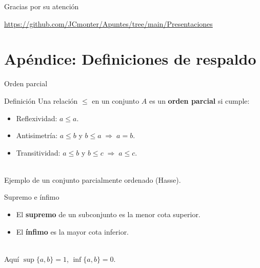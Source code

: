\documentclass[compress,12pt]{beamer}
\begin{document}
\begin{frame}
      \centering
      \Huge{\smiley Gracias por su atención\smiley}
      \vfill
      \scalebox{4}{\faGithub} \par\bigskip
      \url{https://github.com/JCmonter/Apuntes/tree/main/Presentaciones} \\
\end{frame}

\appendix
\section*{Apéndice: Definiciones de respaldo}

\begin{frame}{Orden parcial}
  \begin{block}{Definición}
    Una relación $\leq$ en un conjunto $A$ es un \textbf{orden parcial} si cumple:
    \begin{itemize}
      \item Reflexividad: $a \leq a$.
      \item Antisimetría: $a \leq b$ y $b \leq a \;\Rightarrow\; a=b$.
      \item Transitividad: $a \leq b$ y $b \leq c \;\Rightarrow\; a \leq c$.
    \end{itemize}
  \end{block}
  \vspace{0.5em}
  \centering
  \\
  \scriptsize Ejemplo de un conjunto parcialmente ordenado (Hasse).
\end{frame}

\begin{frame}{Supremo e ínfimo}
  \begin{itemize}
    \item El \textbf{supremo} de un subconjunto es la menor cota superior.
    \item El \textbf{ínfimo} es la mayor cota inferior.
  \end{itemize}
  \vspace{0.8em}
  \centering
  \\
  \scriptsize Aquí $\sup\{a,b\} = 1$, \; $\inf\{a,b\} = 0$.
\end{frame}
\end{document}
